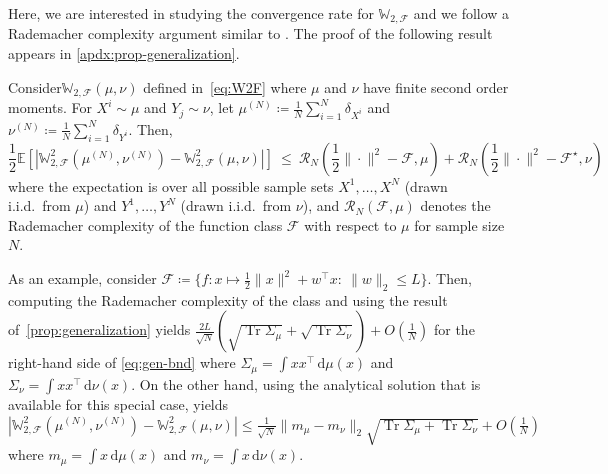 \documentclass[10pt]{article}
\newcommand{\Expect}{\mathbb{E}}
\newcommand{\ud}{\,\mathrm{d}}
\newcommand{\op}[1]{\operatorname{#1}}
\newcommand{\norm}[1]{\|#1\|}
\newcommand{\trace}{\op{Tr}}
\newcommand{\W}{\mathds{W}}
\newcommand{\calF}{\mathcal{F}}
\numberwithin{equation}{section}
\begin{document}
Here, we are interested in studying the convergence rate for $\W_{2,\calF}$ and we follow a Rademacher complexity argument similar to \citet{zhang2017discrimination}. The proof of the following result appears in \autoref{apdx:prop-generalization}.

\begin{theorem}\label{prop:generalization}
	Consider$\W_{2,\calF}(\mu,\nu)$ defined in~\eqref{eq:W2F} where $\mu$ and $\nu$ have finite second order moments. For $X^i\sim \mu$ and $Y_j\sim \nu$, let $\mu^{(N)}\coloneqq \frac{1}{N}\sum_{i=1}^N \delta_{X^i}$ and $\nu^{(N)}\coloneqq \frac{1}{N}\sum_{i=1}^N \delta_{Y^i}$. Then,
	\begin{equation}\label{eq:gen-bnd}
	\frac{1}{2}\Expect \left[ \left| \W_{2,\calF}^2(\mu^{(N)},\nu^{(N)}) -\W_{2,\calF}^2(\mu,\nu)\right| \right]~\leq~ \mathcal{R}_N(\frac{1}{2}\norm{\cdot}^2-\calF,\mu) + \mathcal{R}_N(\frac{1}{2}\norm{\cdot}^2-\calF^\star,\nu)
	\end{equation}
	where the expectation is over all possible sample sets $X^1,\ldots,X^N$ (drawn i.i.d.~from $\mu$) and $Y^1,\ldots,Y^N$ (drawn i.i.d.~from $\nu$), and $\mathcal{R}_N(\calF,\mu)$ denotes the Rademacher complexity of the function class $\calF$ with respect to $\mu$ for sample size $N$. 
\end{theorem}

As an example, consider $\calF \coloneqq \{f:x\mapsto \frac{1}{2}\norm{x}^2 + w^\top x:~\norm{w}_2\leq L \}$. Then, computing the Rademacher complexity of the class and using the result of~\autoref{prop:generalization} yields 
$\frac{2L}{\sqrt{N}}(\sqrt{\trace{\Sigma_\mu}} + \sqrt{\trace{\Sigma_\nu}})+ O(\frac{1}{N})$ for the right-hand side of \eqref{eq:gen-bnd} where $\Sigma_\mu = \int x x^\top \ud \mu(x)$ and $\Sigma_\nu = \int x x^\top \ud \nu(x)$. On the other hand, using the analytical solution that is available for this special case, yields $|\W^2_{2,\calF}(\mu^{(N)},\nu^{(N)}) - \W^2_{2,\calF}(\mu,\nu)| \leq \frac{1}{\sqrt{N}} \norm{m_\mu-m_\nu}_2 \sqrt{\trace{\Sigma_\mu}+\trace{\Sigma_\nu}} + O(\frac{1}{N})$ where $m_\mu = \int x \ud \mu(x)$ and $m_\nu = \int x \ud \nu(x)$.
\end{document}
